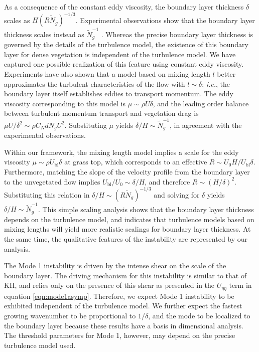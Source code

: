 \documentclass[12pt]{report}   %
\newcommand{\Rey}{{R}}
\newcommand{\Ndg}{\tilde{N}_g}
\newcommand{\ubl}{U_\text{bl}}
\newcommand{\ReyNdg}{{\Rey\Ndg}}
\renewcommand{\bar}{\overline}
\begin{document}
As a consequence of the constant eddy viscosity, the boundary layer thickness $\delta$ scales as $H(\ReyNdg)^{-1/3}$.
Experimental observations show that the boundary layer thickness scales instead as $\Ndg^{-1}$ \cite{Nepf07}.
Whereas the precise boundary layer thickness is governed by the details of the turbulence model, the existence of this boundary layer for dense vegetation is independent of the turbulence model. 
We have captured one possible realization of this feature using constant eddy viscosity.
Experiments have also shown that a model based on mixing length $l$ better approximates the turbulent characteristics of the flow with $l \sim \delta$; \textit{i.e.}, the boundary layer itself establishes eddies to transport momentum. 
The eddy viscosity corresponding to this model is $\mu \sim \rho U \delta$, and the leading order balance between turbulent momentum transport and vegetation drag is $\mu U/\delta^2 \sim \rho C_N d N_g U^2$.
Substituting $\mu$ yields $\delta/H \sim \Ndg^{-1}$, in agreement with the experimental observations.

Within our framework, the mixing length model implies a scale for the eddy viscosity $\mu \sim \rho \ubl \delta$ at grass top, which corresponds to an effective $\Rey \sim U_0H/\ubl \delta$.
Furthermore, matching the slope of the velocity profile from the boundary layer to the unvegetated flow implies $\ubl/U_0 \sim \delta/H$, and therefore $\Rey \sim (H/\delta)^2$.
Substituting this relation in $\delta/H \sim (\Rey \Ndg)^{-1/3}$ and solving for $\delta$ yields $\delta/H \sim \Ndg^{-1}$.
This simple scaling analysis shows that the boundary layer thickness depends on the turbulence model, and indicates that turbulence models based on mixing lengths will yield more realistic scalings for boundary layer thickness.
At the same time, the qualitative features of the instability are represented by our analysis.

The Mode 1 instability is driven by the intense shear on the scale of the boundary layer.
The driving mechanism for this instability is similar to that of KH, and relies only on the presence of this shear as presented in the $\bar{U}_{\eta\eta}$ term in equation \eqref{eqn:mode1asymp}. 
Therefore, we expect Mode 1 instability to be exhibited independent of the turbulence model. 
We further expect the fastest growing wavenumber to be proportional to $1/\delta$, and the mode to be localized to the boundary layer because these results have a basis in dimensional analysis.
The threshold parameters for Mode 1, however, may depend on the precise turbulence model used.
 
\end{document}
